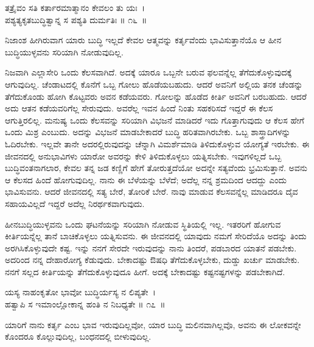 \begin{shloka}
ತತ್ರೈವಂ ಸತಿ ಕರ್ತಾರಮಾತ್ಮಾನಂ ಕೇವಲಂ ತು ಯಃ~।\\ಪಶ್ಯತ್ಯಕೃತಬುದ್ಧಿತ್ವಾನ್ನ ಸ ಪಶ್ಯತಿ ದುರ್ಮತಿಃ \hfill॥ ೧೬~॥
\end{shloka}

\begin{artha}
ನಿಜಾಂಶ ಹೀಗಿರುವಾಗ ಯಾರು ಬುದ್ಧಿ ಇಲ್ಲದೆ ಕೇವಲ ಆತ್ಮವನ್ನು ಕರ್ತೃವೆಂದು ಭಾವಿಸುತ್ತಾನೆಯೊ ಆ ಹೀನ ಬುದ್ಧಿಯುಳ್ಳವನು ಸರಿಯಾಗಿ ನೋಡುವುದಿಲ್ಲ.
\end{artha}

ನಿಜವಾಗಿ ಎಲ್ಲಾಸೇರಿ ಒಂದು ಕೆಲಸವಾಗಿದೆ. ಅದಕ್ಕೆ ಯಾರೂ ಒಬ್ಬನೇ ಬರುವ ಫಲವನ್ನೆಲ್ಲ ತೆಗೆದುಕೊಳ್ಳುವುದಕ್ಕೆ ಆಗುವುದಿಲ್ಲ. ಚೆಂಡಾಟದಲ್ಲಿ ಕೊನೆಗೆ ಒಬ್ಬ ಗೋಲು ಹೊಡೆಯಬಹುದು. ಆದರೆ ಅವನಿಗೆ ಅಲ್ಲಿಯ ತನಕ ಚೆಂಡನ್ನು ತೆಗೆದುಕೊಂಡು ಹೋಗಿ ಕೊಟ್ಟವರು ಅವನ ಕಡೆಯವರು. ಗೋಲನ್ನು ಹೊಡೆದ ಕೀರ್ತಿ ಅವನಿಗೆ ಬರಬಹುದು. ಆದರೆ ಅದು ಆತನ ಕಡೆಯವರಿಗೆಲ್ಲ ಸೇರುವುದು. ಅವರೆಲ್ಲ ಇವನ ಹಿಂದೆ ನಿಂತು ಸಹಕರಿಸದೆ ಇದ್ದರೆ ಈ ಕೆಲಸ ಆಗುತ್ತಿರಲಿಲ್ಲ. ಮನುಷ್ಯ ಒಂದು ಕೆಲಸವನ್ನು ಸರಿಯಾಗಿ ವಿಭಜನೆ ಮಾಡಿದರೆ ಇದು ಗೊತ್ತಾಗುವುದು ಆ ಕೆಲಸ ಹೇಗೆ ಒಂದು ಮಿಶ್ರ ಎಂಬುದು. ಅದನ್ನು ವಿಭಜನೆ ಮಾಡಬೇಕಾದರೆ ಬುದ್ಧಿ ಹರಿತವಾಗಿರಬೇಕು. ಒಬ್ಬ ಶಾಸ್ತ್ರಾದಿಗಳನ್ನು ಓದಿರಬೇಕು. ಇಲ್ಲವೇ ತಾನೇ ಅದರಲ್ಲಿರುವುದನ್ನು ಚೆನ್ನಾಗಿ ವಿಮರ್ಶೆಮಾಡಿ ತಿಳಿದುಕೊಳ್ಳುವ ಯೋಗ್ಯತೆ ಇರಬೇಕು. ಈ ಜೀವನದಲ್ಲಿ ಅನುಭಾವಿಗಳು ಯಾರೋ ಅವರನ್ನು ಕೇಳಿ ತಿಳಿದುಕೊಳ್ಳಲು ಯತ್ನಿಸಬೇಕು. ಇವುಗಳಿಲ್ಲದೆ ಒಬ್ಬ ಬುದ್ಧಿವಂತನಾಗಲಾರ, ಕೇವಲ ತನ್ನ ಜಡ ಕಣ್ಣಿಗೆ ಹೇಗೆ ತೋರುತ್ತದೆಯೋ ಅದನ್ನೇ ಸತ್ಯವೆಂದು ಭ್ರಮಿಸುತ್ತಾನೆ. ಅವನು ಆ ಕೆಲಸದ ಹಿಂದೆ ಹೋಗುವುದಿಲ್ಲ. ನಾನು ಈ ಬೆಳೆಯನ್ನು ಬೆಳೆದೆ; ಅದೆಲ್ಲ ನನ್ನ ಶ್ರಮದಿಂದ ಆದದ್ದು ಎಂದು ಭಾವಿಸುವನು. ಆದರೆ ಜೀವನದಲ್ಲಿ ಸತ್ಯ ಬೇರೆ, ತೋರಿಕೆ ಬೇರೆ. ನಾವು ಮಾಡುವ ಕೆಲಸವನ್ನೆಲ್ಲ ಮಾಡಿದರೂ ದೈವ ಸಹಾಯವಿಲ್ಲದೆ ಇದ್ದರೆ ಅದೆಲ್ಲ ನಿರರ್ಥಕವಾಗುವುದು.

ಹೀನಬುದ್ಧಿಯುಳ್ಳವನು ಒಂದು ಘಟನೆಯನ್ನು ಸರಿಯಾಗಿ ನೋಡುವ ಸ್ಥಿತಿಯಲ್ಲಿ ಇಲ್ಲ. ಇತರರಿಗೆ ಹೋಗುವ ಕೀರ್ತಿಯನ್ನೆಲ್ಲ ತಾನೆ ಬಾಚಿಕೊಳ್ಳಲು ಯತ್ನಿಸುವನು. ಈ ಜೀವನದಲ್ಲಿ ಯಾವುದು ನಮಗೆ ಸೇರಿದೆಯೊ ಅದನ್ನು ತಿಂದು ಅರಗಿಸಿಕೊಳ್ಳುವುದೇ ಕಷ್ಟ. ಇನ್ನು ನನಗೆ ಸೇರದೇ ಇರುವುದನ್ನು ನಾನು ತಿಂದರೆ, ಪಡಬಾರದ ಯಾತನೆ ಪಡಬೇಕು. ಅದರಿಂದ ನನ್ನ ದೇಹಾರೋಗ್ಯ ಕೆಡುವುದು. ಬೇಕಾದಷ್ಟು ಔಷಧಿ ತೆಗೆದುಕೊಳ್ಳಬೇಕು, ದುಡ್ಡು ಖರ್ಚು ಮಾಡಬೇಕು. ನನಗೆ ಸಲ್ಲದ ಕೀರ್ತಿಯನ್ನು ತೆಗೆದುಕೊಳ್ಳುವುದೂ ಹೀಗೆ. ಅದಕ್ಕೆ ಬೇಕಾದಷ್ಟು ಕಷ್ಟನಷ್ಟಗಳನ್ನು ಪಡಬೇಕಾಗಿದೆ.

\begin{shloka}
ಯಸ್ಯ ನಾಹಂಕೃತೋ ಭಾವೋ ಬುದ್ಧಿರ್ಯಸ್ಯ ನ ಲಿಪ್ಯತೇ~।\\ಹತ್ವಾಪಿ ಸ ಇಮಾಂಲ್ಲೋಕಾನ್ನ ಹಂತಿ ನ ನಿಬಧ್ಯತೇ \hfill॥ ೧೭~॥
\end{shloka}

\begin{artha}
ಯಾರಿಗೆ ನಾನು ಕರ್ತೃ ಎಂಬ ಭಾವ ಇರುವುದಿಲ್ಲವೋ, ಯಾರ ಬುದ್ಧಿ ಮಲಿನವಾಗಿಲ್ಲವೊ, ಅವನು ಈ ಲೋಕವನ್ನೇ ಕೊಂದರೂ ಕೊಲ್ಲುವುದಿಲ್ಲ, ಬಂಧನದಲ್ಲಿ ಬೀಳುವುದಿಲ್ಲ.
\end{artha}

